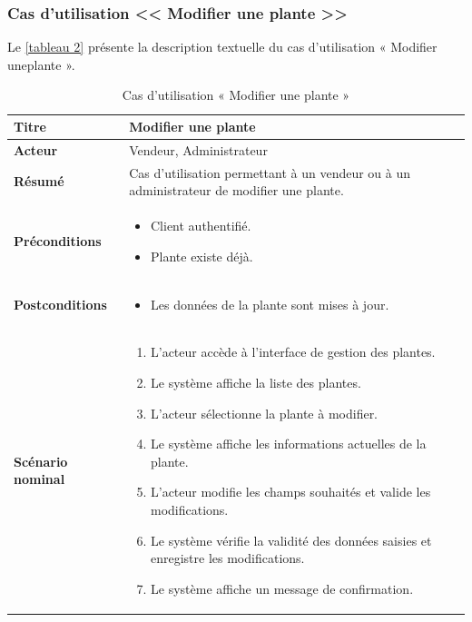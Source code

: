 \subsubsection{Cas d'utilisation << Modifier une plante >>}

Le \autoref{tableau 2} présente la description textuelle du cas d'utilisation « Modifier uneplante ».

\begin{table}[H]
\centering
\renewcommand{\arraystretch}{1.4}
\begin{tabular}{|p{4cm}|p{10cm}|}
\hline
\textbf{Titre} & Modifier une plante \\
\hline
\textbf{Acteur} & Vendeur, Administrateur \\
\hline
\textbf{Résumé} & Cas d'utilisation permettant à un vendeur ou à un administrateur de modifier une plante. \\
\hline
\textbf{Préconditions} &
\vspace{-12pt}
\begin{itemize}
    \item Client authentifié.
    \item Plante existe déjà.
\end{itemize} \\
\hline
\textbf{Postconditions} &
\vspace{-12pt}
\begin{itemize}
    \item Les données de la plante sont mises à jour.
\end{itemize} \\
\hline
\textbf{Scénario nominal} &
\vspace{-12pt}
\begin{enumerate}
    \item L'acteur accède à l'interface de gestion des plantes.
    \item Le système affiche la liste des plantes.
    \item L'acteur sélectionne la plante à modifier.
    \item Le système affiche les informations actuelles de la plante.
    \item L'acteur modifie les champs souhaités et valide les modifications.
    \item Le système vérifie la validité des données saisies et enregistre les modifications.
    \item Le système affiche un message de confirmation.
\end{enumerate} \\
\hline
\end{tabular}
\caption{Cas d'utilisation « Modifier une plante »}
\label{tableau 2}
\end{table}

